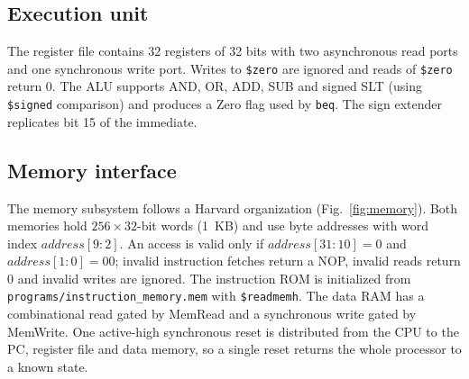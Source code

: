 \documentclass[conference]{IEEEtran}
\begin{document}
\begin{table}[!tbp]
\caption{Main control unit truth table}
\label{tab:control}
\centering
\footnotesize
\setlength{\tabcolsep}{3pt}
\end{table}

\subsection{Execution unit}
The register file contains 32 registers of 32 bits with two asynchronous read
ports and one synchronous write port. Writes to \texttt{\$zero} are ignored and
reads of \texttt{\$zero} return 0. The ALU supports AND, OR, ADD, SUB and
signed SLT (using \texttt{\$signed} comparison) and produces a Zero flag used
by \texttt{beq}. The sign extender replicates bit 15 of the immediate.

\subsection{Memory interface}
The memory subsystem follows a Harvard organization (Fig.~\ref{fig:memory}).
Both memories hold $256\times32$-bit words (1~KB) and use byte addresses with
word index $address[9{:}2]$. An access is valid only if
$address[31{:}10]=0$ and $address[1{:}0]=00$; invalid instruction fetches
return a NOP, invalid reads return 0 and invalid writes are ignored. The
instruction ROM is initialized from \texttt{programs/instruction\_memory.mem}
with \texttt{\$readmemh}. The data RAM has a combinational read gated by
MemRead and a synchronous write gated by MemWrite. One active-high synchronous
reset is distributed from the CPU to the PC, register file and data memory, so
a single reset returns the whole processor to a known state.
\end{document}
